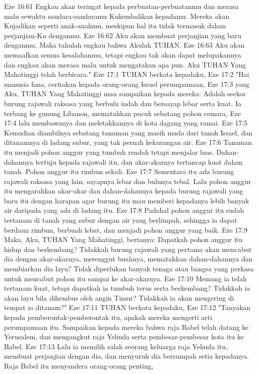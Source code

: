 Eze 16:61  Engkau akan teringat kepada perbuatan-perbuatanmu dan merasa malu sewaktu saudara-saudaramu Kukembalikan kepadamu. Mereka akan Kujadikan seperti anak-anakmu, meskipun hal itu tidak termasuk dalam perjanjian-Ku denganmu.
Eze 16:62  Aku akan membuat perjanjian yang baru denganmu. Maka tahulah engkau bahwa Akulah TUHAN.
Eze 16:63  Aku akan memaafkan semua kesalahanmu, tetapi engkau tak akan dapat melupakannya dan engkau akan merasa malu untuk mengatakan apa pun. Aku TUHAN Yang Mahatinggi telah berbicara."
Eze 17:1  TUHAN berkata kepadaku,
Eze 17:2  "Hai manusia fana, ceritakan kepada orang-orang Israel perumpamaan,
Eze 17:3  yang Aku, TUHAN Yang Mahatinggi mau sampaikan kepada mereka: Adalah seekor burung rajawali raksasa yang berbulu indah dan bersayap lebar serta kuat. Ia terbang ke gunung Libanon, mematahkan pucuk sebatang pohon cemara,
Eze 17:4  lalu membawanya dan meletakkannya di kota dagang yang ramai.
Eze 17:5  Kemudian diambilnya sebatang tanaman yang masih muda dari tanah Israel, dan ditanamnya di ladang subur, yang tak pernah kekurangan air.
Eze 17:6  Tanaman itu menjadi pohon anggur yang tumbuh rendah tetapi menjalar luas. Dahan-dahannya tertuju kepada rajawali itu, dan akar-akarnya tertancap kuat dalam tanah. Pohon anggur itu rimbun sekali.
Eze 17:7  Sementara itu ada burung rajawali raksasa yang lain; sayapnya lebar dan bulunya tebal. Lalu pohon anggur itu mengarahkan akar-akar dan dahan-dahannya kepada burung rajawali yang baru itu dengan harapan agar burung itu mau memberi kepadanya lebih banyak air daripada yang ada di ladang itu.
Eze 17:8  Padahal pohon anggur itu sudah tertanam di tanah yang subur dengan air yang berlimpah, sehingga ia dapat berdaun rimbun, berbuah lebat, dan menjadi pohon anggur yang baik.
Eze 17:9  Maka, Aku, TUHAN Yang Mahatinggi, bertanya: Dapatkah pohon anggur itu hidup dan berkembang? Tidakkah burung rajawali yang pertama akan mencabut dia dengan akar-akarnya, merenggut buahnya, mematahkan dahan-dahannya dan membiarkan dia layu? Tidak diperlukan banyak tenaga atau bangsa yang perkasa untuk mencabut pohon itu sampai ke akar-akarnya.
Eze 17:10  Memang ia telah tertanam kuat, tetapi dapatkah ia tumbuh terus serta berkembang? Tidakkah ia akan layu bila dihembus oleh angin Timur? Tidakkah ia akan mengering di tempat ia ditanam?"
Eze 17:11  TUHAN berkata kepadaku,
Eze 17:12  "Tanyakan kepada pemberontak-pemberontak itu, apakah mereka mengerti arti perumpamaan itu. Sampaikan kepada mereka bahwa raja Babel telah datang ke Yerusalem, dan mengangkut raja Yehuda serta pembesar-pembesar kota itu ke Babel.
Eze 17:13  Lalu ia memilih salah seorang keluarga raja Yehuda itu, membuat perjanjian dengan dia, dan menyuruh dia bersumpah setia kepadanya. Raja Babel itu menyandera orang-orang penting,

